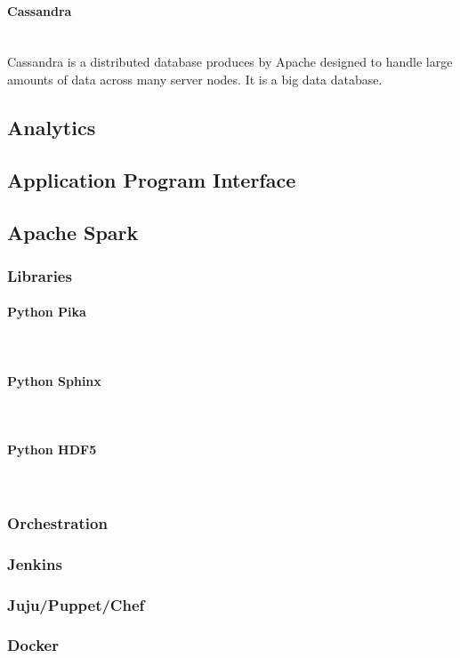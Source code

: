 \paragraph{Cassandra} ~\\
Cassandra is a distributed database produces by Apache designed to handle large amounts of data across many server nodes. It is a big data database.


\iffalse
\subsection{Analytics}
\subsection{Application Program Interface}
\subsection{Apache Spark}


\subsubsection{Libraries}
\paragraph{Python Pika} ~\\
\paragraph{Python Sphinx} ~\\
\paragraph{Python HDF5} ~\\

\subsubsection{Orchestration}
\subsubsection{Jenkins}
\subsubsection{Juju/Puppet/Chef}
\subsubsection{Docker}

